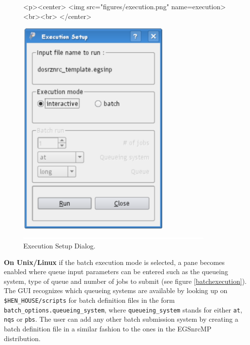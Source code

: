 \documentclass[12pt,twoside]{article}   %
\begin{document}
\begin{figure}[h]
\begin{htmlonly}
\begin{rawhtml}
<p><center>
<img src="figures/execution.png" name=execution><br><br>
</center>
\end{rawhtml}
\end{htmlonly}
\begin{latexonly}
\begin{center}
\includegraphics[height=11cm]{figures/execution}
\end{center}
\end{latexonly}
\begin{center}
\includegraphics[height=1mm]{figures/fake2}
\end{center}
\caption{Execution Setup Dialog.}
\label{execution}
\end{figure}

{\bf On Unix/Linux} if the batch execution mode is selected, a pane becomes enabled where
queue input parameters can be entered such as the queueing system, type of queue 
and number of jobs to submit (see figure \ref{batchexecution}). 
The GUI recognizes which queueing systems are available 
by looking up on {\tt \$HEN\_HOUSE/scripts} for batch definition files in the form 
{\tt batch\_options.queueing\_system},
where {\tt queueing\_system} stands for either {\tt at}, {\tt nqs} or {\tt pbs}. The user
can add any other batch submission system by creating a batch definition file in a similar 
fashion to the ones in the EGSnrcMP distribution.
\end{document}
